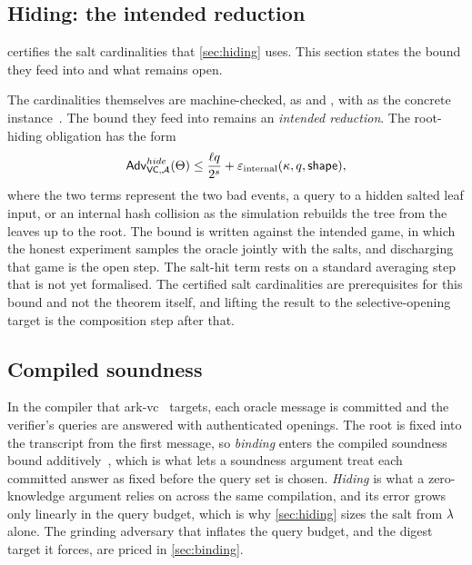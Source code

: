 \subsection{Hiding: the intended reduction}
\label{app:hiding-reduction}

 certifies the salt cardinalities that \cref{sec:hiding} uses.  This
section states the bound they feed into and what remains open.

The cardinalities themselves are machine-checked, as
 and , with
 as the concrete instance~\cite{ZLeanVC26}.  The bound
they feed into remains an \emph{intended reduction}.  The root-hiding obligation has the form
\[
  \mathsf{Adv}^{hide}_{\mathsf{VC},\mathcal{A}}(\Theta)
  \le \frac{\ell q}{2^{s}}
  + \varepsilon_{\mathrm{internal}}(\kappa,q,\mathsf{shape}),
\]
where the two terms represent the two bad events, a query to a hidden salted leaf
input, or an internal hash collision as the simulation rebuilds the tree from the
leaves up to the root.  The bound is written against the intended game, in which the
honest experiment samples the oracle jointly with the salts, and discharging that game
is the open step.  The salt-hit term rests on a standard averaging step that is not yet
formalised.  The certified salt cardinalities are prerequisites for this bound and not
the theorem itself, and lifting the result to the selective-opening target is the
composition step after that.

\subsection{Compiled soundness}
\label{app:compilation}

In the compiler that \textsf{ark-vc}~\cite{ArkVC26} targets, each oracle message is committed and the
verifier's queries are answered with authenticated openings.  The root is fixed into
the transcript from the first message, so \emph{binding} enters the compiled soundness
bound additively~\cite{CDGS24}, which is what lets a soundness argument treat each
committed answer as fixed before the query set is chosen.  \emph{Hiding} is what a
zero-knowledge argument relies on across the same compilation, and its error grows only
linearly in the query budget, which is why \cref{sec:hiding} sizes the salt from $\lambda$
alone.  The grinding
adversary that inflates the query budget, and the digest target it forces, are priced
in \cref{sec:binding}.
